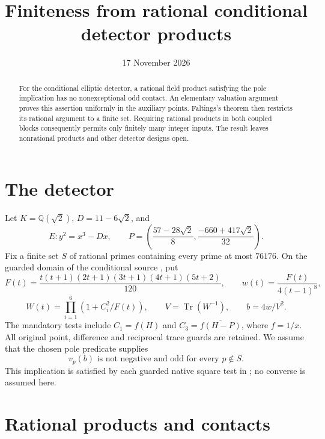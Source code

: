 \documentclass[11pt,a4paper]{article}
\title{Finiteness from rational conditional detector products}
\author{}\date{17 November 2026}
\newcommand{\Q}{\mathbb Q}\newcommand{\Z}{\mathbb Z}
\DeclareMathOperator{\Tr}{Tr}
\begin{document}
\maketitle
\begin{abstract}
For the conditional elliptic detector, a rational field product
satisfying the pole implication has no nonexceptional odd contact.
An elementary valuation argument proves this assertion uniformly
in the auxiliary points. Faltings's theorem then restricts its rational
argument to a finite set. Requiring rational products in both coupled
blocks consequently permits only finitely many integer inputs.
The result leaves nonrational products and other detector designs open.
\end{abstract}

\section{The detector}

Let \(K=\Q(\sqrt2)\), \(D=11-6\sqrt2\), and
\[
 E:y^2=x^3-Dx,\qquad
 P=\left(\frac{57-28\sqrt2}{8},\frac{-660+417\sqrt2}{32}\right).
\]
Fix a finite set \(S\) of rational primes containing every prime
at most \(76176\). On the guarded domain of the conditional source
\cite{Conditional,Reweighted}, put
\[
 F(t)=\frac{t(t+1)(2t+1)(3t+1)(4t+1)(5t+2)}{120},\qquad
 w(t)=\frac{F(t)}{4(t-1)^8},
\]
\[
 W(t)=\prod_{i=1}^6(1+C_i^2/F(t)),\qquad
 V=\Tr(W^{-1}),\qquad b=4w/V^2.
\]
The mandatory tests include \(C_1=f(H)\) and
\(C_3=\overline{f(H-P)}\), where \(f=1/x\).
All original point, difference and reciprocal trace guards are retained.
We assume that the chosen pole predicate supplies
\begin{equation}\label{eq:pole}
 v_p(b)\text{ is not negative and odd for every }p\notin S.
\end{equation}
This implication is satisfied by each guarded native square test
in \cite{Native}; no converse is assumed here.

\section{Rational products and contacts}
\end{document}
